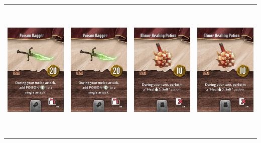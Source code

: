 \documentclass{minimal}
\begin{document}
{\begin{longtable}{llll}
\includegraphics[width=44mm,height=68mm]{./1-14/gh-011-poison-dagger.png} &
\includegraphics[width=44mm,height=68mm]{./1-14/gh-011-poison-dagger.png} &
\includegraphics[width=44mm,height=68mm]{./1-14/gh-012-minor-healing-potion.png} &
\includegraphics[width=44mm,height=68mm]{./1-14/gh-012-minor-healing-potion.png}\\ 

\end{longtable}}
\end{document}
